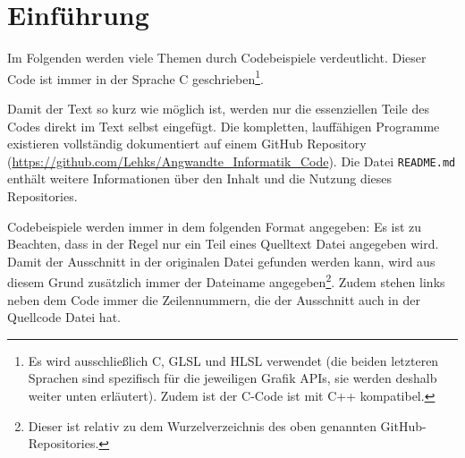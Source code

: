
\section{Einführung}

Im Folgenden werden viele Themen durch Codebeispiele verdeutlicht. Dieser Code ist immer in der Sprache C geschrieben\footnote{Es wird ausschließlich C, GLSL und HLSL verwendet (die beiden letzteren Sprachen sind spezifisch für die jeweiligen Grafik APIs, sie werden deshalb weiter unten erläutert). Zudem ist der C-Code ist mit C++ kompatibel.}.

Damit der Text so kurz wie möglich ist, werden nur die essenziellen Teile des Codes direkt im Text selbst eingefügt. Die kompletten, lauffähigen Programme existieren vollständig dokumentiert auf einem GitHub Repository (\url{https://github.com/Lehks/Angwandte_Informatik_Code}). Die Datei \texttt{README.md} enthält weitere Informationen über den Inhalt und die Nutzung dieses Repositories.

Codebeispiele werden immer in dem folgenden Format angegeben:
Es ist zu Beachten, dass in der Regel nur ein Teil eines Quelltext Datei angegeben wird. Damit der Ausschnitt in der originalen Datei gefunden werden kann, wird aus diesem Grund zusätzlich immer der Dateiname angegeben\footnote{Dieser ist relativ zu dem Wurzelverzeichnis des oben genannten GitHub-Repositories.}. Zudem stehen links neben dem Code immer die Zeilennummern, die der Ausschnitt auch in der Quellcode Datei hat.
